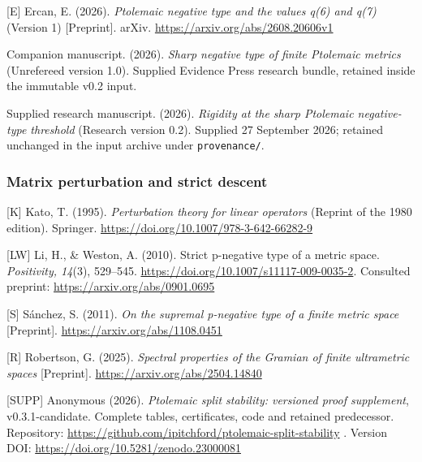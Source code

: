\documentclass[11pt,a4paper]{article}
\begin{document}
{[}E{]} Ercan, E. (2026). \emph{Ptolemaic negative type and the values
q(6) and q(7)} (Version 1) {[}Preprint{]}. arXiv.
\url{https://arxiv.org/abs/2608.20606v1}

Companion manuscript. (2026). \emph{Sharp negative type of finite
Ptolemaic metrics} (Unrefereed version 1.0). Supplied Evidence Press
research bundle, retained inside the immutable v0.2 input.

Supplied research manuscript. (2026). \emph{Rigidity at the sharp
Ptolemaic negative-type threshold} (Research version 0.2). Supplied 27
September 2026; retained unchanged in the input archive under
\texttt{provenance/}.

\subsubsection{Matrix perturbation and strict
descent}\label{matrix-perturbation-and-strict-descent}

{[}K{]} Kato, T. (1995). \emph{Perturbation theory for linear operators}
(Reprint of the 1980 edition). Springer.
\url{https://doi.org/10.1007/978-3-642-66282-9}

{[}LW{]} Li, H., \& Weston, A. (2010). Strict p-negative type of a
metric space. \emph{Positivity, 14}(3), 529--545.
\url{https://doi.org/10.1007/s11117-009-0035-2}. Consulted preprint:
\url{https://arxiv.org/abs/0901.0695}

{[}S{]} Sánchez, S. (2011). \emph{On the supremal p-negative type of a
finite metric space} {[}Preprint{]}.
\url{https://arxiv.org/abs/1108.0451}

{[}R{]} Robertson, G. (2025). \emph{Spectral properties of the Gramian
of finite ultrametric spaces} {[}Preprint{]}.
\url{https://arxiv.org/abs/2504.14840}

{[}SUPP{]} Anonymous (2026). \emph{Ptolemaic split stability: versioned
proof supplement}, v0.3.1-candidate. Complete tables, certificates, code
and retained predecessor. Repository:
\url{https://github.com/ipitchford/ptolemaic-split-stability} . Version
DOI: \url{https://doi.org/10.5281/zenodo.23000081}
\end{document}
